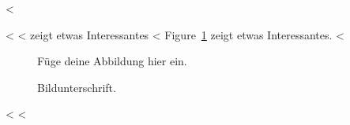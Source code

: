 <%

<%
<%
 zeigt etwas Interessantes
<%
Figure~\ref{fig:label} zeigt etwas Interessantes.
<%

\begin{figure}
  \centering
  Füge deine Abbildung hier ein.
  \caption{Bildunterschrift.}
  \label{fig:label}
\end{figure}
<%
<%
